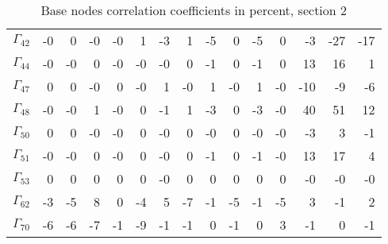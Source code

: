 {\begin{table}
\begin{center}
\begin{minipage}{\linewidth}
\begin{center}
\begin{envsmall}
\begin{center}
\begin{tabular}{rrrrrrrrrrrrrrr}
\\\hline
\end{tabular}
\end{center}
\end{envsmall}
\ifhevea\else
\end{center}
\end{minipage}
\fi
\end{center}
\ifhevea\end{table}\fi
\ifhevea\begin{table}\fi%
\begin{center}
\ifhevea
\caption{Base nodes correlation coefficients in percent, section 2\label{tab:br-fit-corr2}}%
\else
\begin{minipage}{\linewidth}
\begin{center}
\label{tab:br-fit-corr2}%
\fi
\begin{envsmall}
\begin{center}
\renewcommand*{\arraystretch}{1.1}%
\begin{tabular}{rrrrrrrrrrrrrrr}
\hline
\( \Gamma_{42} \) &   -0 &    0 &   -0 &   -0 &    1 &   -3 &    1 &   -5 &    0 &   -5 &    0 &   -3 &  -27 &  -17 \\
\( \Gamma_{44} \) &   -0 &   -0 &    0 &   -0 &   -0 &   -0 &    0 &   -1 &    0 &   -1 &    0 &   13 &   16 &    1 \\
\( \Gamma_{47} \) &    0 &    0 &   -0 &    0 &   -0 &    1 &   -0 &    1 &   -0 &    1 &   -0 &  -10 &   -9 &   -6 \\
\( \Gamma_{48} \) &   -0 &   -0 &    1 &   -0 &    0 &   -1 &    1 &   -3 &    0 &   -3 &   -0 &   40 &   51 &   12 \\
\( \Gamma_{50} \) &    0 &    0 &   -0 &   -0 &    0 &   -0 &    0 &   -0 &    0 &   -0 &   -0 &   -3 &    3 &   -1 \\
\( \Gamma_{51} \) &   -0 &   -0 &    0 &   -0 &    0 &   -0 &    0 &   -1 &    0 &   -1 &   -0 &   13 &   17 &    4 \\
\( \Gamma_{53} \) &    0 &    0 &    0 &    0 &    0 &   -0 &    0 &    0 &    0 &    0 &    0 &   -0 &   -0 &   -0 \\
\( \Gamma_{62} \) &   -3 &   -5 &    8 &    0 &   -4 &    5 &   -7 &   -1 &   -5 &   -1 &   -5 &    3 &   -1 &    2 \\
\( \Gamma_{70} \) &   -6 &   -6 &   -7 &   -1 &   -9 &   -1 &   -1 &    0 &   -1 &    0 &    3 &   -1 &    0 &   -1 \\

\end{tabular}
\end{center}
\end{envsmall}
\end{center}
\end{minipage}
\end{center}
\end{table}}
